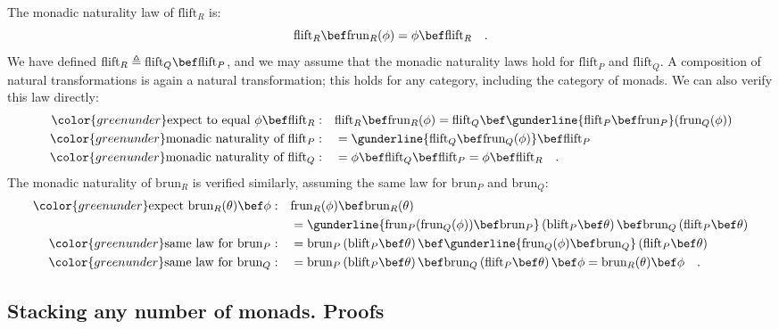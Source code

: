 The monadic naturality law of $\text{flift}_{R}$ is:
\[
\text{flift}_{R}\bef\text{frun}_{R}(\phi)=\phi\bef\text{flift}_{R}\quad.
\]
We have defined $\text{flift}_{R}\triangleq\text{flift}_{Q}\bef\text{flift}_{P}$,
and we may assume that the monadic naturality laws hold for $\text{flift}_{P}$
and $\text{flift}_{Q}$. A composition of natural transformations
is again a natural transformation; this holds for any category, including
the category of monads. We can also verify this law directly:
\begin{align*}
{\color{greenunder}\text{expect to equal }\phi\bef\text{flift}_{R}:}\quad & \text{flift}_{R}\bef\text{frun}_{R}(\phi)=\text{flift}_{Q}\bef\gunderline{\text{flift}_{P}\bef\text{frun}_{P}}(\text{frun}_{Q}(\phi))\\
{\color{greenunder}\text{monadic naturality of }\text{flift}_{P}:}\quad & =\gunderline{\text{flift}_{Q}\bef\text{frun}_{Q}(\phi)}\bef\text{flift}_{P}\\
{\color{greenunder}\text{monadic naturality of }\text{flift}_{Q}:}\quad & =\phi\bef\text{flift}_{Q}\bef\text{flift}_{P}=\phi\bef\text{flift}_{R}\quad.
\end{align*}
The monadic naturality of $\text{brun}_{R}$ is verified similarly,
assuming the same law for $\text{brun}_{P}$ and $\text{brun}_{Q}$:
\begin{align*}
{\color{greenunder}\text{expect }\text{brun}_{R}(\theta)\bef\phi:}\quad & \text{frun}_{R}(\phi)\bef\text{brun}_{R}(\theta)\\
 & =\gunderline{\text{frun}_{P}(\text{frun}_{Q}(\phi))\bef\text{brun}_{P}}\left(\text{blift}_{P}\bef\theta\right)\bef\text{brun}_{Q}\left(\text{flift}_{P}\bef\theta\right)\\
{\color{greenunder}\text{same law for }\text{brun}_{P}:}\quad & =\text{brun}_{P}\left(\text{blift}_{P}\bef\theta\right)\bef\gunderline{\text{frun}_{Q}(\phi)\bef\text{brun}_{Q}}\left(\text{flift}_{P}\bef\theta\right)\\
{\color{greenunder}\text{same law for }\text{brun}_{Q}:}\quad & =\text{brun}_{P}\left(\text{blift}_{P}\bef\theta\right)\bef\text{brun}_{Q}\left(\text{flift}_{P}\bef\theta\right)\bef\phi=\text{brun}_{R}(\theta)\bef\phi\quad.
\end{align*}
 

\subsection{Stacking any number of monads. Proofs\label{subsec:Stacking-any-number-of-monads}}

